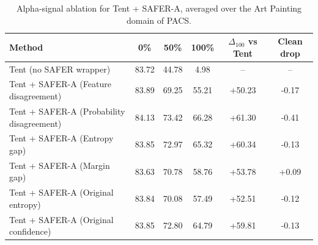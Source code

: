 \begin{table}[t]
\centering
\caption{Alpha-signal ablation for Tent + SAFER-A, averaged over the Art Painting domain of PACS.}
\label{tab:abl-alpha-signal}
\begin{tabular}{lccccc}
\hline
Method & 0\% & 50\% & 100\% & $\Delta_{100}$ vs Tent & Clean drop \\
\hline
Tent (no SAFER wrapper) & 83.72 & 44.78 & 4.98 & -- & -- \\
Tent + SAFER-A (Feature disagreement) & 83.89 & 69.25 & 55.21 & +50.23 & -0.17 \\
Tent + SAFER-A (Probability disagreement) & 84.13 & 73.42 & 66.28 & +61.30 & -0.41 \\
Tent + SAFER-A (Entropy gap) & 83.85 & 72.97 & 65.32 & +60.34 & -0.13 \\
Tent + SAFER-A (Margin gap) & 83.63 & 70.78 & 58.76 & +53.78 & +0.09 \\
Tent + SAFER-A (Original entropy) & 83.84 & 70.08 & 57.49 & +52.51 & -0.12 \\
Tent + SAFER-A (Original confidence) & 83.85 & 72.80 & 64.79 & +59.81 & -0.13 \\
\hline
\end{tabular}
\end{table}
